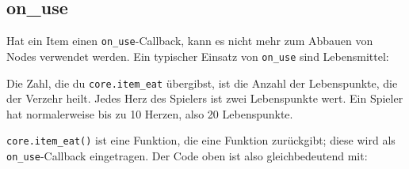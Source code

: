\subsection{on\_use}\label{on_use}

Hat ein Item einen
\texttt{on\_\allowbreak{}use}-Callback,
kann es nicht mehr zum Abbauen von Nodes verwendet werden. Ein typischer
Einsatz von \texttt{on\_\allowbreak{}use} sind Lebensmittel:

\begin{Shaded}
\begin{Highlighting}[]
\OperatorTok{(}\OperatorTok{,} \OperatorTok{\{}
     \OperatorTok{=} \OperatorTok{,}
     \OperatorTok{=} \OperatorTok{,}
     \OperatorTok{=} \OperatorTok{(}\OperatorTok{),}
\OperatorTok{\})}
\end{Highlighting}
\end{Shaded}

Die Zahl, die du
\texttt{core.\allowbreak{}item\_\allowbreak{}eat}
übergibst, ist die Anzahl der
Lebenspunkte, die der Verzehr heilt.
Jedes Herz des Spielers ist zwei Lebenspunkte wert. Ein Spieler hat
normalerweise bis zu 10 Herzen, also 20 Lebenspunkte.

\texttt{core.\allowbreak{}item\_\allowbreak{}eat()} ist eine Funktion,
die eine Funktion zurückgibt; diese wird als
\texttt{on\_\allowbreak{}use}-Callback eingetragen. Der Code oben ist
also gleichbedeutend mit:

\begin{Shaded}
\begin{Highlighting}[]
\OperatorTok{(}\OperatorTok{,} \OperatorTok{\{}
     \OperatorTok{=} \OperatorTok{,}
     \OperatorTok{=} \OperatorTok{,}
     \OperatorTok{=} 
         \OperatorTok{(}\OperatorTok{,} \OperatorTok{,} 
    \OperatorTok{,}
\OperatorTok{\})}
\end{Highlighting}
\end{Shaded}

